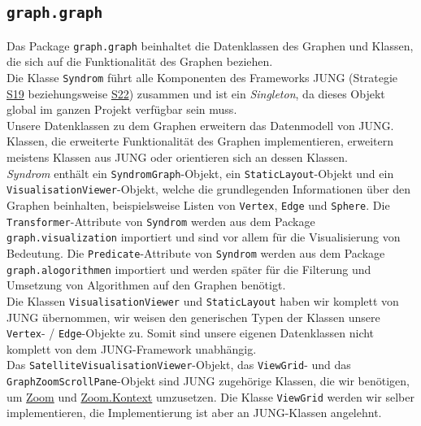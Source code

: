 \documentclass[enabledeprecatedfontcommands,fontsize=11pt,paper=a4,twoside]{scrartcl}
\newcounter{one}
\begin{document}
	
	
	
	
	
	\newpage
	
	\subsection{\texttt{graph.graph}}
	
	Das Package \texttt{graph.graph} beinhaltet die Datenklassen des Graphen und Klassen, die sich auf die Funktionalität des Graphen beziehen. \\
	
	Die Klasse \texttt{Syndrom} führt alle Komponenten des Frameworks JUNG (Strategie \hyperlink{eee}{S19} beziehungsweise \hyperlink{fff}{S22}) zusammen und ist ein \textit{Singleton}, da dieses Objekt global im ganzen Projekt verfügbar sein muss. \\
	Unsere Datenklassen zu dem Graphen erweitern das Datenmodell von JUNG. Klassen, die erweiterte Funktionalität des Graphen implementieren, erweitern meistens Klassen aus JUNG oder orientieren sich an dessen Klassen. \\
	
	\textit{Syndrom} enthält ein \texttt{SyndromGraph}-Objekt, ein \texttt{StaticLayout}-Objekt und ein \texttt{VisualisationViewer}-Objekt, welche die grundlegenden Informationen über den Graphen beinhalten, beispielsweise Listen von \texttt{Vertex}, \texttt{Edge} und \texttt{Sphere}. Die \texttt{Transformer}-Attribute von \texttt{Syndrom} werden aus dem Package \texttt{graph.visualization} importiert und sind vor allem für die Visualisierung von Bedeutung. Die \texttt{Predicate}-Attribute von \texttt{Syndrom} werden aus dem Package \texttt{graph.alogorithmen} importiert und werden später für die Filterung und Umsetzung von Algorithmen auf den Graphen benötigt. \\
	
	Die Klassen \texttt{VisualisationViewer} und \texttt{StaticLayout} haben wir komplett von JUNG übernommen, wir weisen den generischen Typen der Klassen unsere \texttt{Vertex}- / \texttt{Edge}-Objekte zu. Somit sind unsere eigenen Datenklassen nicht  komplett von dem JUNG-Framework unabhängig.\\
	
	Das \texttt{SatelliteVisualisationViewer}-Objekt, das \texttt{ViewGrid}- und das \texttt{GraphZoomScrollPane}-Objekt sind JUNG zugehörige Klassen, die wir benötigen, um \hyperlink{dd}{Zoom} und \hyperlink{ff}{Zoom.Kontext} umzusetzen. Die Klasse \texttt{ViewGrid} werden wir selber implementieren, die Implementierung ist aber an JUNG-Klassen angelehnt.\\
	
\end{document}
